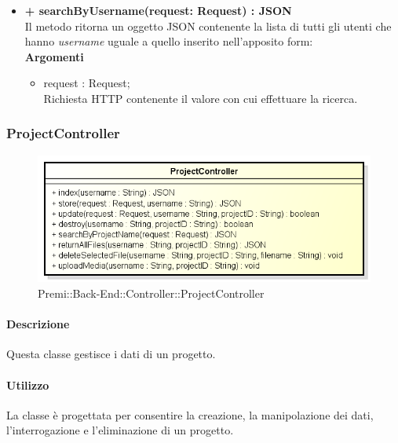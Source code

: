 \begin{itemize}
			\item \textbf{+ searchByUsername(request: Request) : JSON}\\
			Il metodo ritorna un oggetto \gls{JSON} contenente la lista di tutti gli utenti che hanno \textit{username} uguale a quello inserito nell'apposito form:\\
			\textbf{Argomenti}
			\begin{itemize}
				\item request : Request;\\
				Richiesta HTTP contenente il valore con cui effettuare la ricerca.
			\end{itemize}
		\end{itemize}
		
\newpage
\subsubsection{ProjectController}
\begin{figure}[h]
\centering
\includegraphics[width=0.8\linewidth]{img/back_end_http_controllers_projectController}
\caption[Premi::Back-End::Controller::ProjectController]{Premi::Back-End::Controller::ProjectController}
\label{fig:back_end_http_controllers_projectController}
\end{figure}

	\paragraph{Descrizione}
		Questa classe gestisce i dati di un progetto.
	\paragraph{Utilizzo}
		La classe è progettata per consentire la creazione, la manipolazione dei dati, l'interrogazione e l'eliminazione di un progetto.
		
